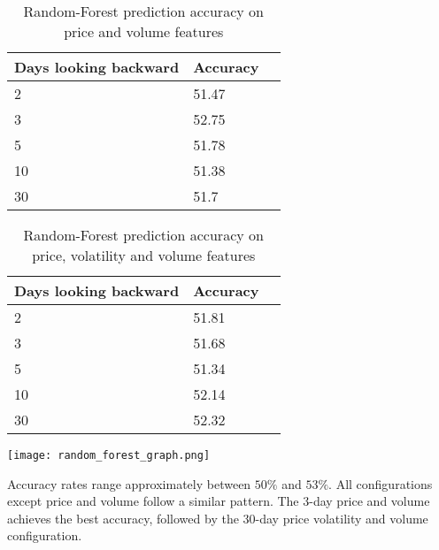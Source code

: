 \documentclass{article}
\begin{document}
\begin{table}[h]
\begin{center}
    \begin{tabular}{ | l | l | p{3cm} |}
    \hline
    Days looking backward & Accuracy \\ \hline
    2 & 51.47  \\ \hline
    3 & 52.75  \\ \hline
    5 & 51.78  \\ \hline
    10 & 51.38  \\ \hline
    30 & 51.7 \\ 
    \hline
    \end{tabular}
\caption{Random-Forest prediction accuracy on price and volume features}
\end{center}
\end{table}

\begin{table}[!h]
\begin{center}
    \begin{tabular}{ | l | l | p{3cm} |}
    \hline
    Days looking backward & Accuracy \\ \hline
    2 & 51.81  \\ \hline
    3 & 51.68  \\ \hline
    5 & 51.34  \\ \hline
    10 & 52.14  \\ \hline
    30 & 52.32 \\ 
    \hline
    \end{tabular}
\caption{Random-Forest prediction accuracy on price, volatility and volume features}
\end{center}
\end{table}
\texttt{[image: random\_forest\_graph.png]}

Accuracy rates range approximately between $50\%$ and $53\%$. All configurations except price and volume follow a similar pattern. The 3-day price and volume achieves the best accuracy, followed by the 30-day price volatility and volume configuration.

\newpage
\end{document}
